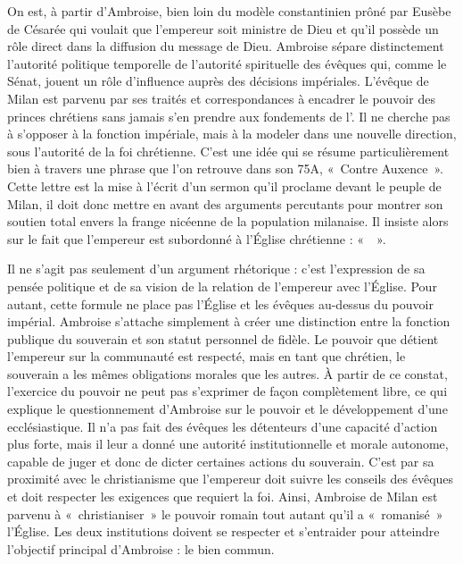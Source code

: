 \bigskip

On est, à partir d'Ambroise, bien loin du modèle constantinien prôné par Eusèbe de Césarée qui voulait que l'empereur soit ministre de Dieu et qu'il possède un rôle direct dans la diffusion du message de Dieu. Ambroise sépare distinctement l'autorité politique temporelle de l'autorité spirituelle des évêques qui, comme le Sénat, jouent un rôle d'influence auprès des décisions impériales. L'évêque de Milan est parvenu par ses traités et correspondances à encadrer le pouvoir des princes chrétiens sans jamais s'en prendre aux fondements de l'. Il ne cherche pas à s'opposer à la fonction impériale, mais à la modeler dans une nouvelle direction, sous l'autorité de la foi chrétienne. C'est une idée qui se résume particulièrement bien à travers une phrase que l'on retrouve dans son  75A, «~Contre Auxence~». Cette lettre est la mise à l'écrit d'un sermon qu'il proclame devant le peuple de Milan, il doit donc mettre en avant des arguments percutants pour montrer son soutien total envers la frange nicéenne de la population milanaise. Il insiste alors sur le fait que l'empereur est subordonné à l'Église chrétienne : «~~»\autocite[\nopp 75A, 36]{ambroise_lettres}.

\bigskip

Il ne s'agit pas seulement d'un argument rhétorique : c'est l'expression de sa pensée politique et de sa vision de la relation de l'empereur avec l'Église. Pour autant, cette formule ne place pas l'Église et les évêques au-dessus du pouvoir impérial. Ambroise s'attache simplement à créer une distinction entre la fonction publique du souverain et son statut personnel de fidèle. Le pouvoir que détient l'empereur sur la communauté est respecté, mais en tant que chrétien, le souverain a les mêmes obligations morales que les autres. À partir de ce constat, l'exercice du pouvoir ne peut pas s'exprimer de façon complètement libre, ce qui explique le questionnement d'Ambroise sur le pouvoir et le développement d'une  ecclésiastique. Il n'a pas fait des évêques les détenteurs d'une capacité d'action plus forte, mais il leur a donné une autorité institutionnelle et morale autonome, capable de juger et donc de dicter certaines actions du souverain. C'est par sa proximité avec le christianisme que l'empereur doit suivre les conseils des évêques et doit respecter les exigences que requiert la foi. Ainsi, Ambroise de Milan est parvenu à «~christianiser~» le pouvoir romain tout autant qu'il a «~romanisé~» l'Église. Les deux institutions doivent se respecter et s'entraider pour atteindre l'objectif principal d'Ambroise : le bien commun.

